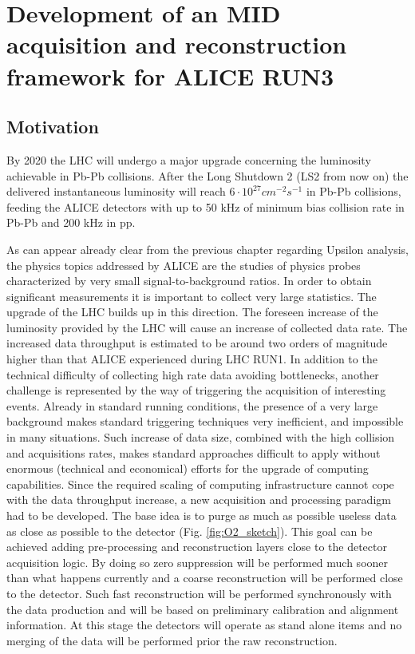 \chapter{Development of an MID acquisition and reconstruction framework for ALICE RUN3}

\section{Motivation}
By 2020 the LHC will undergo a major upgrade concerning the luminosity achievable in Pb-Pb collisions.
After the Long Shutdown 2 (LS2 from now on) the delivered instantaneous luminosity will reach $6\cdot10^{27} cm^{-2}s^{-1}$ in Pb-Pb collisions, feeding the ALICE detectors with up to 50 kHz of minimum bias collision rate in Pb-Pb and 200 kHz in pp.

As can appear already clear from the previous chapter regarding Upsilon analysis, the physics topics addressed by ALICE are the studies of physics probes characterized by very small signal-to-background ratios.
In order to obtain significant measurements it is important to collect very large statistics.
The upgrade of the LHC builds up in this direction.
The foreseen increase of the luminosity provided by the LHC will cause an increase of collected data rate.
The increased data throughput is estimated to be around two orders of magnitude higher than that ALICE experienced during LHC RUN1.
In addition to the technical difficulty of collecting high rate data avoiding bottlenecks, another challenge is represented by the way of triggering the acquisition of interesting events.
Already in standard running conditions, the presence of a very large background makes standard triggering techniques very inefficient, and impossible in many situations.
Such increase of data size, combined with the high collision and acquisitions rates, makes standard approaches difficult to apply without enormous (technical and economical) efforts for the upgrade of computing capabilities.
Since the required scaling of computing infrastructure cannot cope with the data throughput increase, a new acquisition and processing paradigm had to be developed.
The base idea is to purge as much as possible useless data as close as possible to the detector (Fig. \ref{fig:O2_sketch}).
This goal can be achieved adding pre-processing and reconstruction layers close to the detector acquisition logic.
By doing so zero suppression will be performed much sooner than what happens currently and a coarse reconstruction will be performed close to the detector.
Such fast reconstruction will be performed synchronously with the data production and will be based on preliminary calibration and alignment information.
At this stage the detectors will operate as stand alone items and no merging of the data will be performed prior the raw reconstruction.

